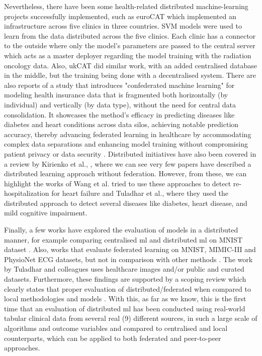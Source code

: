 Nevertheless, there have been some health-related distributed machine-learning projects successfully implemented, such as euroCAT \cite{eurocat} which implemented an infrastructure across five clinics in three countries. SVM models were used to learn from the data distributed across the five clinics. Each clinic has a connector to the outside where only the model's parameters are passed to the central server which acts as a master deployer regarding the model training with the radiation oncology data. Also, ukCAT \cite{ukcat} did similar work, with an added centralised database in the middle, but the training being done with a decentralised system. There are also reports of a study that introduces "confederated machine learning" for modeling health insurance data that is fragmented both horizontally (by individual) and vertically (by data type), without the need for central data consolidation. It showcases the method's efficacy in predicting diseases like diabetes and heart conditions across data silos, achieving notable prediction accuracy, thereby advancing federated learning in healthcare by accommodating complex data separations and enhancing model training without compromising patient privacy or data security \cite{liuConfederatedLearningHealthcare2022}. Distributed initiatives have also been covered in a review by Kirienko et al., \cite{kirienkoDistributedLearningReliable2021a}, where we can see very few papers have described a distributed learning approach without federation. However, from these, we can highlight the works of Wang et al. \cite{wangFastDivideandconquerSparse2019} tried to use these approaches to detect re-hospitalization for heart failure and Tuladhar et al., \cite{distributed} where they used the distributed approach to detect several diseases like diabetes, heart disease, and mild cognitive impairment.

Finally, a few works have explored the evaluation of models in a distributed manner, for example comparing  centralised \ac{ml} and distributed \ac{ml} on MNIST dataset \cite{performance_evaluation_1}. Also, works that evaluate federated learning on MNIST, MIMIC-III and PhysioNet ECG datasets, but not in comparison with other methods \cite{performance_evaluation_2}. The work by Tuladhar and colleagues \cite{distributed} uses healthcare images and/or public and curated datasets. Furthermore, these findings are supported by a scoping review which clearly states that proper  evaluation of distributed/federated when compared to local methodologies and models \cite{liFederatedDistributedLearning2023}. With this, as far as we know, this is the first time that an evaluation of distributed \ac{ml} has been conducted using real-world tabular clinical data from several real (9) different sources, in such a large scale of algorithms and outcome variables and compared to centralised and local counterparts, which can be applied to both federated and peer-to-peer approaches.
